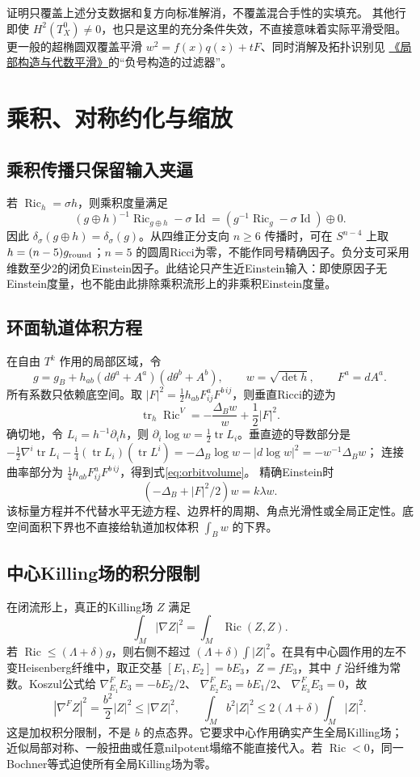 \documentclass[UTF8,a4paper,11pt,fontset=fandol]{ctexart}
\numberwithin{equation}{section}
\theoremstyle{definition}
\newcommand{\Ric}{\operatorname{Ric}}
\newcommand{\tr}{\operatorname{tr}}
\newcommand{\Id}{\operatorname{Id}}
\begin{document}
证明只覆盖上述分支数据和复方向标准解消，不覆盖混合手性的实填充。
其他行即使 $H^2(T_X^0)\ne0$，也只是这里的充分条件失效，不直接意味着实际平滑受阻。
更一般的超椭圆双覆盖平滑
$w^2=f(x)q(z)+tF$、同时消解及拓扑识别见
\href{20260912.tex}{《局部构造与代数平滑》}的“负号构造的过滤器”。

\appendix
\section{乘积、对称约化与缩放}
\subsection{乘积传播只保留输入夹逼}
若 $\Ric_h=\sigma h$，则乘积度量满足
\[
(g\oplus h)^{-1}\Ric_{g\oplus h}-\sigma\Id
=(g^{-1}\Ric_g-\sigma\Id)\oplus0.
\]
因此 $\delta_\sigma(g\oplus h)=\delta_\sigma(g)$。从四维正分支向 $n\ge6$ 传播时，可在 $S^{n-4}$ 上取 $h=(n-5)g_{\rm round}$；$n=5$ 的圆周Ricci为零，不能作同号精确因子。负分支可采用维数至少2的闭负Einstein因子。此结论只产生近Einstein输入：即使原因子无Einstein度量，也不能由此排除乘积流形上的非乘积Einstein度量。

\subsection{环面轨道体积方程}
在自由 $T^k$ 作用的局部区域，令
\[
g=g_B+h_{ab}(d\theta^a+A^a)(d\theta^b+A^b),\qquad
w=\sqrt{\det h},\qquad F^a=dA^a.
\]
所有系数只依赖底空间。取 $|F|^2=\frac12h_{ab}F^a_{ij}F^{b\,ij}$，则垂直Ricci的迹为
\begin{equation}\label{eq:orbitvolume}
\tr_h\Ric^V=-\frac{\Delta_Bw}{w}+\frac12|F|^2 .
\end{equation}
确切地，令 $L_i=h^{-1}\partial_i h$，则
$\partial_i\log w=\frac12\tr L_i$。垂直迹的导数部分是
$-\frac12\nabla^i\tr L_i-\frac14(\tr L_i)(\tr L^i)
=-\Delta_B\log w-|d\log w|^2=-w^{-1}\Delta_Bw$；
连接曲率部分为 $\frac14h_{ab}F^a_{ij}F^{b\,ij}$，得到式\eqref{eq:orbitvolume}。
精确Einstein时
\[
(-\Delta_B+|F|^2/2)w=k\lambda w.
\]
该标量方程并不代替水平无迹方程、边界杆的周期、角点光滑性或全局正定性。底空间面积下界也不直接给轨道加权体积 $\int_Bw$ 的下界。

\subsection{中心Killing场的积分限制}
在闭流形上，真正的Killing场 $Z$ 满足
\[
\int_M|\nabla Z|^2=\int_M\Ric(Z,Z).
\]
若 $\Ric\le(\Lambda+\delta)g$，则右侧不超过
$(\Lambda+\delta)\int|Z|^2$。在具有中心圆作用的左不变Heisenberg纤维中，取正交基
$[E_1,E_2]=bE_3$，$Z=fE_3$，其中 $f$ 沿纤维为常数。Koszul公式给
$\nabla^F_{E_1}E_3=-bE_2/2$、
$\nabla^F_{E_2}E_3=bE_1/2$、
$\nabla^F_{E_3}E_3=0$，故
\[
|\nabla^FZ|^2=\frac{b^2}{2}|Z|^2
\le|\nabla Z|^2,\qquad
\int_Mb^2|Z|^2\le2(\Lambda+\delta)\int_M|Z|^2.
\]
这是加权积分限制，不是 $b$ 的点态界。它要求中心作用确实产生全局Killing场；近似局部对称、一般扭曲或任意nilpotent塌缩不能直接代入。若 $\Ric<0$，同一Bochner等式迫使所有全局Killing场为零。
\end{document}
